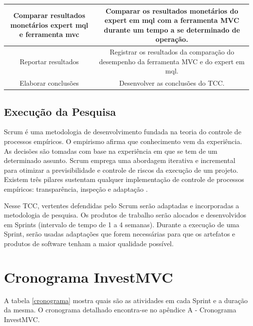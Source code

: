 \begin{table}[H]
\begin{center}
\begin{tabular}{ | c | c |}
	Comparar resultados monetários expert mql e ferramenta mvc & Comparar os resultados monetários do expert em mql com a ferramenta MVC durante um tempo a se determinado de operação.\\ \hline
	Reportar resultados & Registrar os resultados da comparação do desempenho da ferramenta MVC e do expert em mql.\\ \hline
	Elaborar conclusões & Desenvolver as conclusões do TCC.\\ \hline
    \end{tabular}
    \end{center}
\label{atividadeMetologia}
\end{table}

\section{Execução da Pesquisa}

Scrum é uma metodologia de desenvolvimento fundada na teoria do controle de processos empíricos. O empirismo afirma que conhecimento vem da experiência. As decisões são tomadas com base na experiência em que se tem de um determinado assunto. Scrum emprega uma abordagem iterativa e incremental para otimizar a previsibilidade e controle de riscos da execução de um projeto. Existem três pilares sustentam qualquer implementação de controle de processos empíricos: transparência, inspeção e adaptação \cite[pág.~4]{schwaber2013}.

Nesse TCC, vertentes defendidas pelo Scrum serão adaptadas e incorporadas a metodologia de pesquisa. Os produtos de  trabalho serão alocados e desenvolvidos em Sprints (intervalo de tempo de 1 a 4 semanas). Durante a execução de uma Sprint, serão usadas adaptações que forem necessárias para que os artefatos e  produtos de software tenham a maior qualidade possível.

\chapter{Cronograma InvestMVC}

A tabela \ref{cronograma} mostra quais são as atividades em cada Sprint e a duração da mesma. O cronograma detalhado encontra-se no apêndice A - Cronograma InvestMVC.

